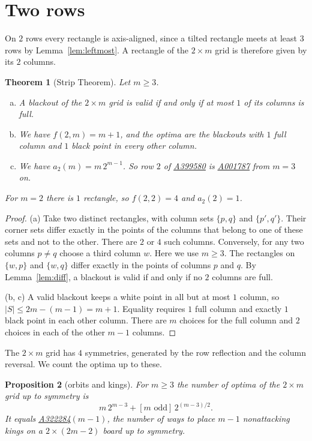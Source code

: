 \documentclass[12pt]{article}
\theoremstyle{plain}
\newtheorem{theorem}{Theorem}
\newtheorem{proposition}[theorem]{Proposition}
\theoremstyle{definition}
\theoremstyle{remark}
\newcommand{\seqnum}[1]{\href{https://oeis.org/#1}{\rm \underline{#1}}}
\begin{document}
\section{Two rows}\label{sec:strip}

On $2$ rows every rectangle is axis-aligned, since a tilted rectangle meets at
least $3$ rows by Lemma~\ref{lem:leftmost}. A rectangle of the $2\times m$ grid
is therefore given by its $2$ columns.

\begin{theorem}[Strip Theorem]\label{thm:strip}
Let $m\ge3$.
\begin{enumerate}[(a)]
\item A blackout of the $2\times m$ grid is valid if and only if at most $1$ of
its columns is full.
\item We have $f(2,m)=m+1$, and the optima are the blackouts with $1$ full column
and $1$ black point in every other column.
\item We have $a_2(m)=m\,2^{m-1}$. So row $2$ of \seqnum{A399580} is
\seqnum{A001787} from $m=3$ on.
\end{enumerate}
For $m=2$ there is $1$ rectangle, so $f(2,2)=4$ and $a_2(2)=1$.
\end{theorem}

\begin{proof}
(a) Take two distinct rectangles, with column sets $\{p,q\}$ and $\{p',q'\}$.
Their corner sets differ exactly in the points of the columns that belong to
one of these sets and not to the other. There are $2$ or $4$ such columns.
Conversely, for any two columns $p\ne q$ choose a third column $w$. Here we
use $m\ge3$. The rectangles on $\{w,p\}$ and $\{w,q\}$ differ exactly in
the points of columns $p$ and $q$. By Lemma~\ref{lem:diff}, a blackout is
valid if and only if no $2$ columns are full.

(b, c) A valid blackout keeps a white point in all but at most $1$ column, so
$|S|\le2m-(m-1)=m+1$. Equality requires $1$ full column and exactly $1$ black
point in each other column. There are $m$ choices for the full column and $2$
choices in each of the other $m-1$ columns.
\end{proof}

The $2\times m$ grid has $4$ symmetries, generated by the row reflection and
the column reversal. We count the optima up to these.

\begin{proposition}[orbits and kings]\label{prop:kings}
For $m\ge3$ the number of optima of the $2\times m$ grid up to symmetry is
\[
m\,2^{m-3}+[m\text{ odd}]\,2^{(m-3)/2}.
\]
It equals \seqnum{A322284}$(m-1)$, the number of ways to place $m-1$
nonattacking kings on a $2\times(2m-2)$ board up to symmetry.
\end{proposition}
\end{document}
